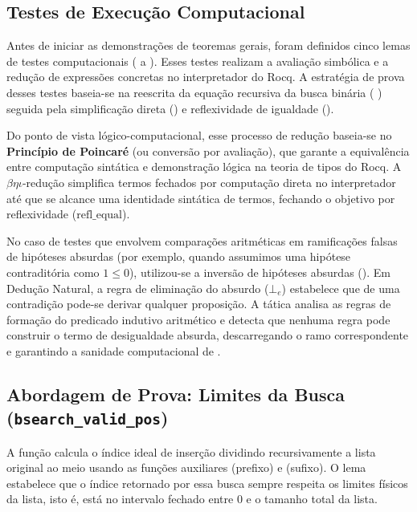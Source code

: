 \documentclass{article}
\begin{document}
\subsection{Testes de Execução Computacional}
Antes de iniciar as demonstrações de teoremas gerais, foram definidos cinco lemas de testes computacionais ( a ). Esses testes realizam a avaliação simbólica e a redução de expressões concretas no interpretador do Rocq. A estratégia de prova desses testes baseia-se na reescrita da equação recursiva da busca binária ( ) seguida pela simplificação direta () e reflexividade de igualdade ().

Do ponto de vista lógico-computacional, esse processo de redução baseia-se no \textbf{Princípio de Poincaré} (ou conversão por avaliação), que garante a equivalência entre computação sintática e demonstração lógica na teoria de tipos do Rocq. A $\beta\eta\iota$-redução simplifica termos fechados por computação direta no interpretador até que se alcance uma identidade sintática de termos, fechando o objetivo por reflexividade ($\text{refl\_equal}$).

No caso de testes que envolvem comparações aritméticas em ramificações falsas de hipóteses absurdas (por exemplo, quando assumimos uma hipótese contraditória como $1 \le 0$), utilizou-se a inversão de hipóteses absurdas (). Em Dedução Natural, a regra de eliminação do absurdo ($\bot_e$) estabelece que de uma contradição pode-se derivar qualquer proposição. A tática  analisa as regras de formação do predicado indutivo aritmético e detecta que nenhuma regra pode construir o termo de desigualdade absurda, descarregando o ramo correspondente e garantindo a sanidade computacional de .

\subsection{Abordagem de Prova: Limites da Busca (\texttt{bsearch\_valid\_pos})}
A função  calcula o índice ideal de inserção dividindo recursivamente a lista original ao meio usando as funções auxiliares  (prefixo) e  (sufixo). O lema  estabelece que o índice retornado por essa busca sempre respeita os limites físicos da lista, isto é, está no intervalo fechado entre $0$ e o tamanho total da lista.
\end{document}
